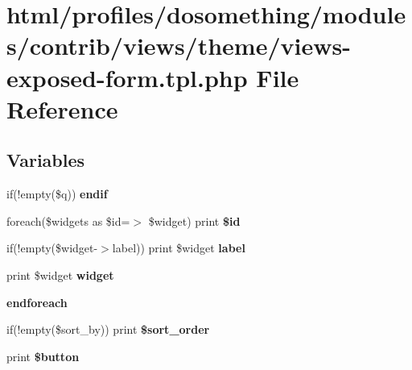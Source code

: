 \hypertarget{views-exposed-form_8tpl_8php}{
\section{html/profiles/dosomething/modules/contrib/views/theme/views-\/exposed-\/form.tpl.php File Reference}
\label{views-exposed-form_8tpl_8php}
}
\subsection*{Variables}
\begin{DoxyCompactItemize}
\item 
\hypertarget{views-exposed-form_8tpl_8php_aa2cbf3d18320e72113738a0aac58a048}{
if(!empty(\$q)) {\bfseries endif}}
\label{views-exposed-form_8tpl_8php_aa2cbf3d18320e72113738a0aac58a048}

\item 
\hypertarget{views-exposed-form_8tpl_8php_afb50f6bd39cc445d89a7f76368ae8a65}{
foreach(\$widgets as \$id=$>$ \$widget) print {\bfseries \$id}}
\label{views-exposed-form_8tpl_8php_afb50f6bd39cc445d89a7f76368ae8a65}

\item 
\hypertarget{views-exposed-form_8tpl_8php_a715d99dc689c8c847ee23619ffa9495b}{
if(!empty(\$widget-\/$>$label)) print \$widget {\bfseries label}}
\label{views-exposed-form_8tpl_8php_a715d99dc689c8c847ee23619ffa9495b}

\item 
\hypertarget{views-exposed-form_8tpl_8php_a36d328c3630d51e9dcdf8d9532b8b14c}{
print \$widget {\bfseries widget}}
\label{views-exposed-form_8tpl_8php_a36d328c3630d51e9dcdf8d9532b8b14c}

\item 
\hypertarget{views-exposed-form_8tpl_8php_a672d9707ef91db026c210f98cc601123}{
{\bfseries endforeach}}
\label{views-exposed-form_8tpl_8php_a672d9707ef91db026c210f98cc601123}

\item 
\hypertarget{views-exposed-form_8tpl_8php_afe2f42554c9f98a7c79fda26be118718}{
if(!empty(\$sort\_\-by)) print {\bfseries \$sort\_\-order}}
\label{views-exposed-form_8tpl_8php_afe2f42554c9f98a7c79fda26be118718}

\item 
\hypertarget{views-exposed-form_8tpl_8php_a6fc2d49e6a14767e126038af79c13e2b}{
print {\bfseries \$button}}
\label{views-exposed-form_8tpl_8php_a6fc2d49e6a14767e126038af79c13e2b}

\end{DoxyCompactItemize}


